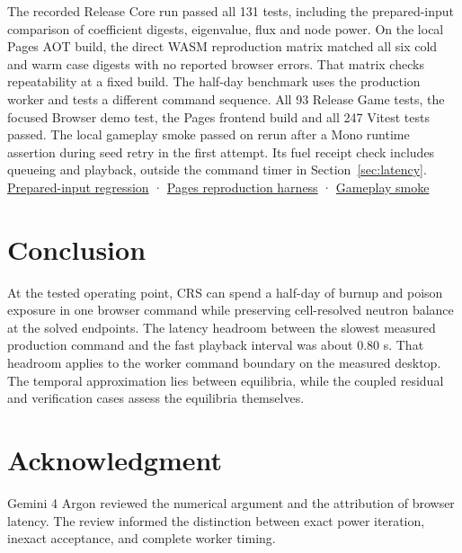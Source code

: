 \documentclass[11pt,letterpaper]{article}
\begin{document}
The recorded Release Core run passed all 131 tests, including the prepared-input comparison of
coefficient digests, eigenvalue, flux and node power. On the local Pages AOT build, the direct WASM reproduction matrix matched all
six cold and warm case digests with no reported browser errors. That matrix checks
repeatability at a fixed build. The half-day benchmark uses the production worker and
tests a different command sequence. All 93 Release Game tests, the focused Browser demo
test, the Pages frontend build and all 247 Vitest tests passed. The local gameplay smoke
passed on rerun after a Mono runtime assertion during seed retry in the first attempt.
Its fuel receipt check includes queueing and playback, outside the command timer in
Section~\ref{sec:latency}.
\href{https://github.com/hkkho/CRS/blob/4341ae8881f5827988c3d8b1859aa9e8f13cd8a6/tests/ReactorSim.Core.Tests/EquilibriumCoreSolverTests.cs\#L37}{Prepared-input
regression} ·
\href{https://github.com/hkkho/CRS/blob/4341ae8881f5827988c3d8b1859aa9e8f13cd8a6/web/candu-playtest/scripts/benchmark-wasm.mjs}{Pages
reproduction harness} ·
\href{https://github.com/hkkho/CRS/blob/4341ae8881f5827988c3d8b1859aa9e8f13cd8a6/web/candu-playtest/scripts/demo-smoke.mjs}{Gameplay
smoke}

\section{Conclusion}\label{conclusion}

At the tested operating point, CRS can spend a half-day of burnup and poison exposure in
one browser command while preserving cell-resolved neutron balance at the solved
endpoints. The latency headroom between the slowest measured production command and the
fast playback interval was about 0.80 s. That headroom applies to the worker command
boundary on the measured desktop. The temporal approximation lies between equilibria,
while the coupled residual and verification cases assess the equilibria themselves.

\section*{Acknowledgment}\label{acknowledgment}

Gemini 4 Argon reviewed the numerical argument and the attribution of browser latency.
The review informed the distinction between exact power iteration, inexact acceptance,
and complete worker timing.
\end{document}
